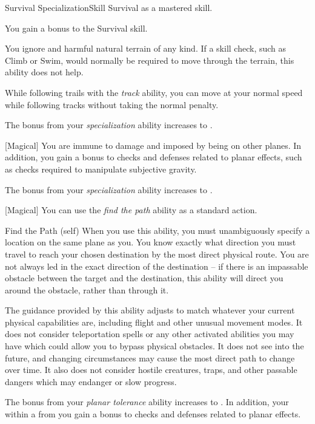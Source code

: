     \begin{feat}{Survival Specialization}{Skill}
        \featpre Survival as a mastered skill.

         You gain a  bonus to the Survival skill.

         You ignore  and harmful natural terrain of any kind.
        If a skill check, such as Climb or Swim, would normally be required to move through the terrain, this ability does not help.

        While following trails with the \textit{track} ability, you can move at your normal speed while following tracks without taking the normal  penalty.

         The bonus from your \textit{specialization} ability increases to .

        [Magical] You are immune to damage and  imposed by being on other planes.
        In addition, you gain a  bonus to checks and defenses related to planar effects, such as checks required to manipulate subjective gravity.

         The bonus from your \textit{specialization} ability increases to .

        [Magical] You can use the \textit{find the path} ability as a standard action.
        \begin{attuneability}{Find the Path}
             (self)
            \rankline
            When you use this ability, you must unambiguously specify a location on the same plane as you.
            You know exactly what direction you must travel to reach your chosen destination by the most direct physical route.
            You are not always led in the exact direction of the destination -- if there is an impassable obstacle between the target and the destination, this ability will direct you around the obstacle, rather than through it.

            The guidance provided by this ability adjusts to match whatever your current physical capabilities are, including flight and other unusual movement modes.
            It does not consider teleportation spells or any other activated abilities you may have which could allow you to bypass physical obstacles.
            It does not see into the future, and changing circumstances may cause the most direct path to change over time.
            It also does not consider hostile creatures, traps, and other passable dangers which may endanger or slow progress.
        \end{attuneability}

         The bonus from your \textit{planar tolerance} ability increases to .
        In addition, your  within a \hugearea {} from you gain a  bonus to checks and defenses related to planar effects.
    \end{feat}

